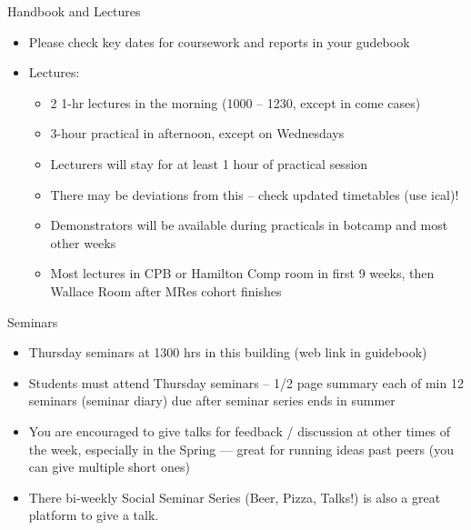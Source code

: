 \documentclass[xcolor={usenames,x11names},compress]{beamer}
\renewcommand{\(}{\begin{columns}}
\renewcommand{\)}{\end{columns}}
\newcommand{\<}[1]{\begin{column}{#1}}
\renewcommand{\>}{\end{column}}
\begin{document}
\begin{frame}{Handbook and Lectures}
  
  \begin{itemize}\setlength{\itemindent}{0em}\itemsep6pt
    \item Please check key dates for coursework and reports in your gudebook
    \item Lectures:
    \begin{itemize}\setlength{\itemindent}{-1em}
      \item 2 1-hr lectures in the morning (1000 -- 1230, except in come cases)
      \item 3-hour practical in afternoon, except on Wednesdays
      \item Lecturers will stay for at least 1 hour of practical session
      \item There may be deviations from this -- check updated timetables (use ical)!
      \item Demonstrators will be available during practicals in botcamp and most other weeks
      \item Most lectures in CPB or Hamilton Comp room in first 9 weeks, then Wallace Room after MRes cohort finishes
    \end{itemize}
 \end{itemize}  
  \end{frame}

\begin{frame}{Seminars}

  \begin{itemize}\setlength{\itemindent}{0em}\itemsep12pt

    \item Thursday seminars at 1300 hrs in this building (web link in guidebook)
    \item Students must attend Thursday seminars -- 1/2 page summary each 
of min 12 seminars (seminar diary) due after seminar series ends in summer
	 \item You are encouraged to give talks for feedback / discussion at 
	 other times of the week, especially in the Spring --- great for 
	 running ideas past peers (you can give multiple short ones)

	 \item There bi-weekly Social Seminar Series (Beer, Pizza, Talks!) is also a great platform to give a talk.   
	  
	  \end{itemize}

  \end{frame}
\end{document}
